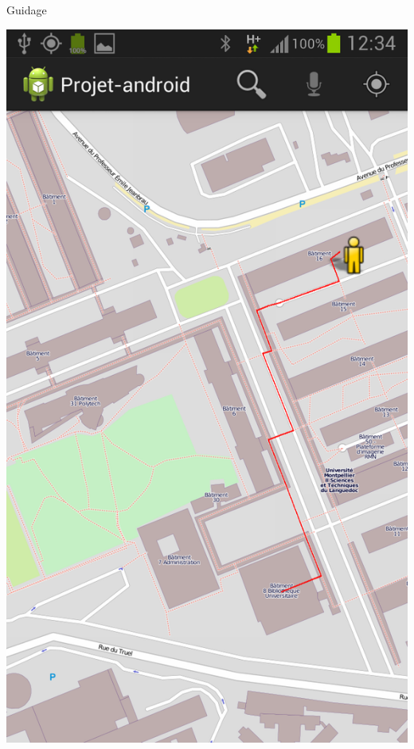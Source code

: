 \documentclass{beamer}
\begin{document}
		\begin{frame}
			Guidage
			\begin{center}
				\includegraphics[scale=0.15]{../rapport/guidage.png}
			\end{center}
		\end{frame}
		
\end{document}
